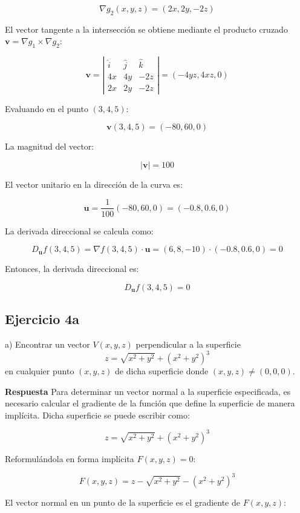 \documentclass{report}
\begin{document}
    \[
    \nabla g_2(x, y, z) = (2x, 2y, -2z)
    \]

    El vector tangente a la intersección se obtiene mediante el producto cruzado \( \mathbf{v} = \nabla g_1 \times \nabla g_2 \):

    \[
    \mathbf{v} = \left| \begin{matrix} \hat{i} & \hat{j} & \hat{k} \\ 4x & 4y & -2z \\ 2x & 2y & -2z \end{matrix} \right| = (-4yz, 4xz, 0)
    \]

    Evaluando en el punto \((3,4,5)\):

    \[
    \mathbf{v}(3, 4, 5) = (-80, 60, 0)
    \]

    La magnitud del vector:

    \[
    | \mathbf{v} | = 100
    \]

    El vector unitario en la dirección de la curva es:

    \[
    \mathbf{u} = \frac{1}{100} (-80, 60, 0) = (-0.8, 0.6, 0)
    \]

    La derivada direccional se calcula como:

    \[
    D_{\mathbf{u}} f(3, 4, 5) = \nabla f(3, 4, 5) \cdot \mathbf{u} = (6, 8, -10) \cdot (-0.8, 0.6, 0) = 0
    \]

    Entonces, la derivada direccional es:

    \[
    D_{\mathbf{u}} f(3, 4, 5) = 0
    \]\subsection*{Ejercicio 4a}
    a) Encontrar un vector $V(x, y, z)$ perpendicular a la superficie
    $$
    z=\sqrt{x^{2}+y^{2}}+\left(x^{2}+y^{2}\right)^{3}
    $$
    en cualquier punto $(x, y, z)$ de dicha superficie donde $(x, y, z) \neq(0,0,0)$.

    \textbf{Respuesta} 
    Para determinar un vector normal a la superficie especificada, es necesario calcular el gradiente de la función que define la superficie de manera implícita. Dicha superficie se puede escribir como:

    \[
    z = \sqrt{x^2 + y^2} + \left( x^2 + y^2 \right)^3
    \]

    Reformulándola en forma implícita \( F(x, y, z) = 0 \):

    \[
    F(x, y, z) = z - \sqrt{x^2 + y^2} - \left( x^2 + y^2 \right)^3
    \]

    El vector normal en un punto de la superficie es el gradiente de \( F(x, y, z) \):
\end{document}
